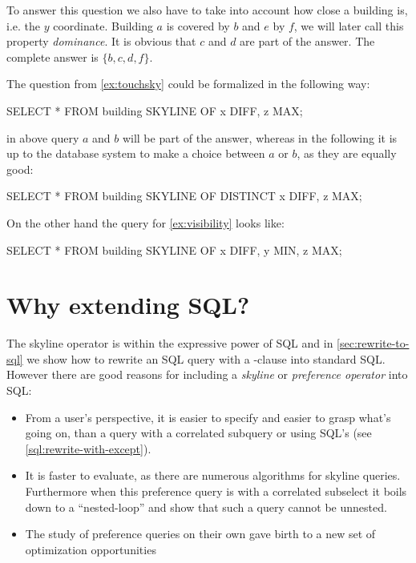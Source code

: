 \begin{example}\label{ex:visibility}
To answer this question we also have to take into account how close a
building is, i.e. the $y$ coordinate.  Building $a$ is covered by $b$
and $e$ by $f$, we will later call this property \emph{dominance}. It
is obvious that $c$ and $d$ are part of the answer. The complete
answer is $\{b, c, d, f\}$.
\end{example}

\noindent
The question from \autoref{ex:touchsky} could be formalized in the
following way:

\begin{interactive}
SELECT * FROM building SKYLINE OF x DIFF, z MAX;
\end{interactive}

\noindent
in above query $a$ and $b$ will be part of the answer, whereas in the following
it is up to the database system to make a choice between $a$ or $b$, as they 
are equally good:

\begin{interactive}
SELECT * FROM building SKYLINE OF DISTINCT x DIFF, z MAX;
\end{interactive}

\noindent
On the other hand the query for \autoref{ex:visibility} looks like:

\begin{interactive}
SELECT * FROM building SKYLINE OF x DIFF, y MIN, z MAX;
\end{interactive}

\section{Why extending SQL?}
The skyline operator is within the expressive power of SQL and in
\autoref{sec:rewrite-to-sql} we show how to rewrite an SQL query with
a -clause into standard SQL. 
However there are good reasons for including a \emph{skyline} or 
\emph{preference operator} into SQL:

\begin{itemize}
\item 
From a user's perspective, it is easier to specify and easier to grasp
what's going on, than a query with a correlated subquery or using
SQL's  (see \autoref{sql:rewrite-with-except}).

\item
It is faster to evaluate, as there are numerous algorithms for skyline
queries. Furthermore when this preference query is with a correlated
subselect it boils down to a \naive ``nested-loop'' and
\citet{Grust1997, Braumandl1998} show that such a query cannot be
unnested.

\item
The study of preference queries on their own gave birth to a new set
of optimization opportunities \citep{Chomicki2003a, Kiessling2003}
\end{itemize}

